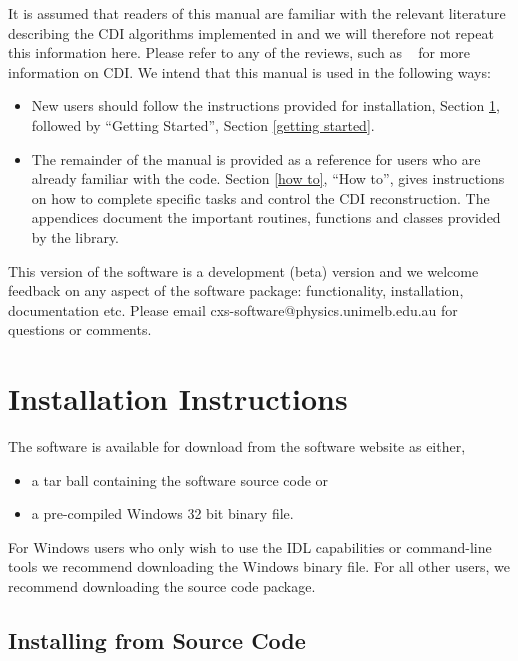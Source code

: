 \documentclass[]{nadia}
\begin{document}
It is assumed that readers of this manual are familiar with the
relevant literature describing the CDI algorithms implemented in \name
and we will therefore not repeat this information here. Please refer
to any of the reviews, such as ~\cite{quiney2010coherent} for more information on CDI. We intend
that this manual is used in the following ways:
\begin{itemize}
\item New users should follow the instructions provided for
  installation, Section \ref{installation}, followed by ``Getting
  Started'', Section \ref{getting started}.
\item The remainder of the manual is provided as a reference for users
  who are already familiar with the code. Section \ref{how to}, ``How
  to'', gives instructions on how to complete specific tasks and
  control the CDI reconstruction. The appendices document the
  important routines, functions and classes provided by the \name
  library.
\end{itemize}
This version of the software is a development (beta) version and we
welcome feedback on any aspect of the software package: functionality,
installation, documentation etc. Please email
cxs-software@physics.unimelb.edu.au for questions or comments.


\newpage
\section{Installation Instructions}
\label{installation}

The software is available for download from the software website as either,
\begin{itemize}
\item a tar ball containing the software source code or
\item a pre-compiled Windows 32 bit binary file.
\end{itemize}

For Windows users who only wish to use the IDL capabilities or
command-line tools we recommend downloading the Windows binary file. For
all other users, we recommend downloading the source code package.

\subsection{Installing from Source Code}
\end{document}
